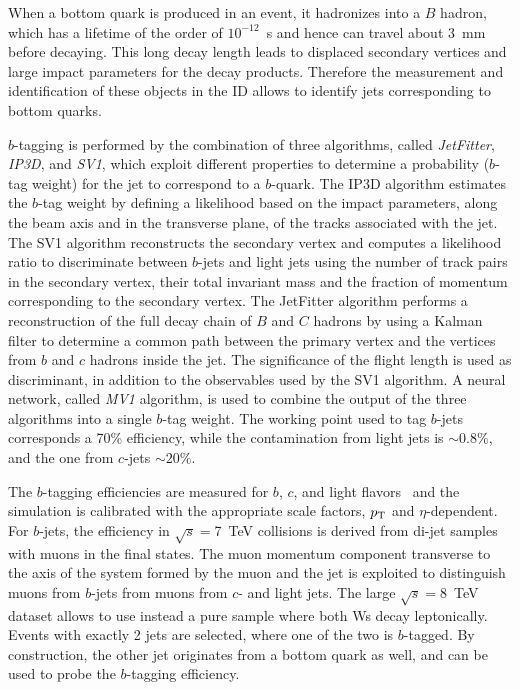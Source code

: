 When a bottom quark is produced in an event, it hadronizes into a $B$
hadron, which has a lifetime of the order of $10^{-12}$~s and hence
can travel about 3~mm before decaying.
This long decay length leads to displaced secondary vertices and large impact parameters
for the decay products. Therefore the measurement and identification
of these objects in the ID allows to identify jets corresponding to
bottom quarks.

$b$-tagging is performed by the combination of three algorithms,
called {\it JetFitter}, {\it IP3D}, and {\it SV1}, which exploit
different properties to determine a probability ($b$-tag weight) for
the jet to correspond to a $b$-quark.
The IP3D algorithm estimates the $b$-tag weight by defining a
likelihood based on the impact parameters, along the beam axis and in
the transverse plane, of the tracks associated with the jet.
The SV1 algorithm reconstructs the secondary vertex and computes a
likelihood ratio to discriminate between $b$-jets and light jets using
the number of track pairs in the secondary vertex, their total
invariant mass and the fraction of momentum corresponding to the
secondary vertex.
The JetFitter algorithm performs a reconstruction of the full decay
chain of $B$ and $C$ hadrons by using a Kalman filter to determine a
common path between the primary vertex and the vertices from $b$ and
$c$ hadrons inside the jet. The significance of the flight length is
used as discriminant, in addition to the observables used by the
SV1 algorithm.
A neural network, called {\it MV1} algorithm, is used to combine the
output of the three algorithms into a single $b$-tag weight.
The working point used to tag $b$-jets corresponds a 70\% efficiency,
while the contamination from light jets is $\sim0.8\%$, and the one
from $c$-jets $\sim20\%$.

The $b$-tagging efficiencies are measured for 
$b$, $c$, and light flavors~\cite{btagging,ctagging,ltagging} and the
simulation is calibrated with the appropriate scale factors, $p_{\mathrm{T}}$ and
$\eta$-dependent.
For $b$-jets, the efficiency in $\sqrt{s} = $7~TeV collisions is
derived from di-jet samples with muons in the final states. 
The muon momentum component transverse to
the axis of the system formed by the muon and the jet is exploited
to distinguish muons from $b$-jets from muons from $c$- and light
jets. The large $\sqrt{s} = $8~TeV dataset allows to use instead a pure
\ttbar{} sample where both Ws decay leptonically. Events with exactly
2 jets are selected, where one of the two is $b$-tagged. By
construction, the other jet originates from a bottom quark as well, and
can be used to probe the $b$-tagging efficiency.

